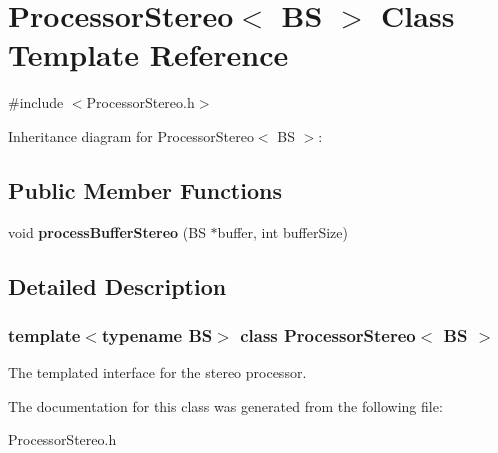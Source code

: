 \hypertarget{classProcessorStereo}{}\section{Processor\+Stereo$<$ BS $>$ Class Template Reference}
\label{classProcessorStereo}


{\ttfamily \#include $<$Processor\+Stereo.\+h$>$}



Inheritance diagram for Processor\+Stereo$<$ BS $>$\+:
\subsection*{Public Member Functions}
\begin{DoxyCompactItemize}
\item 
\mbox{\label{classProcessorStereo_abd7cb142ea2e049bf144329bf56ff621}} 
void {\bfseries process\+Buffer\+Stereo} (BS $\ast$buffer, int buffer\+Size)
\end{DoxyCompactItemize}


\subsection{Detailed Description}
\subsubsection*{template$<$typename BS$>$\newline
class Processor\+Stereo$<$ B\+S $>$}

The templated interface for the stereo processor. 

The documentation for this class was generated from the following file\+:\begin{DoxyCompactItemize}
\item 
Processor\+Stereo.\+h\end{DoxyCompactItemize}

